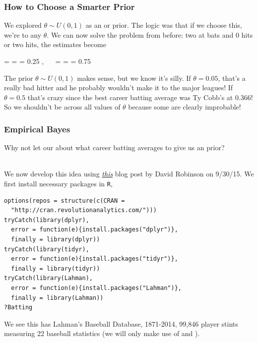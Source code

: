 \documentclass[slides]{beamer} %
\begin{document}
\begin{frame}
	\frametitle{How to Choose a Smarter Prior}
	
We explored $\theta \sim U(0,1)$ as an  or  prior. \pause The logic was that if we choose this, we're  to any $\theta$. \pause We can now solve the problem from before: two at bats and 0 hits or two hits, the estimates become

\beqn
{} =  =  = 0.25 , \pause ~~  =  =  = 0.75 
\eeqn\pause 


The prior $\theta \sim U(0,1)$ makes sense, but we know it's silly. \pause If $\theta = 0.05$, that's a really bad hitter and he probably wouldn't make it to the major leagues! \pause If $\theta = 0.5$ that's crazy since the best career batting average was Ty Cobb's at 0.366! \pause So we shouldn't be  across all values of $\theta$ because some are clearly improbable!
\end{frame}


\begin{frame}[fragile]
	\frametitle{Empirical Bayes}

\scriptsize
Why not let our  about what career batting averages to give us an  prior? \\~\\\pause 

We now develop this idea using \href{http://www.r-bloggers.com/understanding-empirical-bayes-estimation-using-baseball-statistics/}{\emph{this}} blog post by David Robinson on 9/30/15. \pause We first install necessary packages in \texttt{R},

\begin{verbatim}
options(repos = structure(c(CRAN = 
  "http://cran.revolutionanalytics.com/")))
tryCatch(library(dplyr), 
  error = function(e){install.packages("dplyr")}, 
  finally = library(dplyr))
tryCatch(library(tidyr), 
  error = function(e){install.packages("tidyr")}, 
  finally = library(tidyr))
tryCatch(library(Lahman), 
  error = function(e){install.packages("Lahman")}, 
  finally = library(Lahman))
?Batting		
\end{verbatim}\pause 

We see this has Lahman's Baseball Database, 1871-2014, 99,846 player stints measuring 22 baseball statistics (we will only make use of  and ).

\end{frame}
\end{document}
